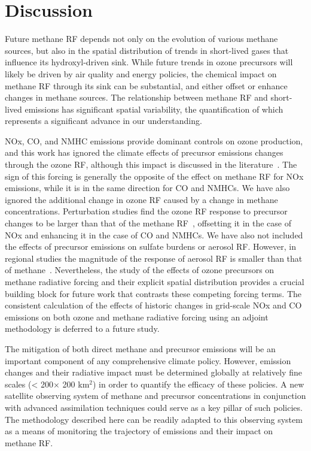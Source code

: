 \section{Discussion}

Future methane RF depends not only on the evolution of various methane sources, but also in the spatial distribution of trends in short-lived gases that influence its hydroxyl-driven sink. While future trends in ozone precursors will likely be driven by air quality and energy policies, the chemical impact on methane RF through its sink can be substantial, and either offset or enhance changes in methane sources. The relationship between methane RF and short-lived emissions has significant spatial variability, the quantification of which represents a significant advance in our understanding.

NOx, CO, and NMHC emissions provide dominant controls on ozone production, and this work has ignored the climate effects of precursor emissions changes through the ozone RF, although this impact is discussed in the literature~\citep{ref:naik2005,ref:bowman2012,ref:shindell2013}. The sign of this forcing is generally the opposite of the effect on methane RF for NOx emissions, while it is in the same direction for CO and NMHCs. We have also ignored the additional change in ozone RF caused by a change in methane concentrations. Perturbation studies find the ozone RF response to precursor changes to be larger than that of the methane RF~\citep{ref:akimoto2015}, offsetting it in the case of NOx and enhancing it in the case of CO and NMHCs. We have also not included the effects of precursor emissions on sulfate burdens or aerosol RF. However, in regional studies the magnitude of the response of aerosol RF is smaller than that of methane~\citep{ref:fry2012}. Nevertheless, the study of the effects of ozone precursors on methane radiative forcing and their explicit spatial distribution provides a crucial building block for future work that contrasts these competing forcing terms. The consistent calculation of the effects of historic changes in grid-scale NOx and CO emissions on both ozone and methane radiative forcing using an adjoint methodology is deferred to a future study.

The mitigation of both direct methane and precursor emissions will be an important component of any comprehensive climate policy.  However, emission changes and their radiative impact must be determined globally at relatively fine scales (< 200$\times$ 200 km$^2$) in order to quantify the efficacy of these policies.  A new satellite observing system of methane and precursor concentrations in conjunction with advanced assimilation techniques could serve as a key pillar of such policies. The methodology described here can be readily adapted to this observing system as a means of monitoring the trajectory of emissions and their impact on methane RF.  

